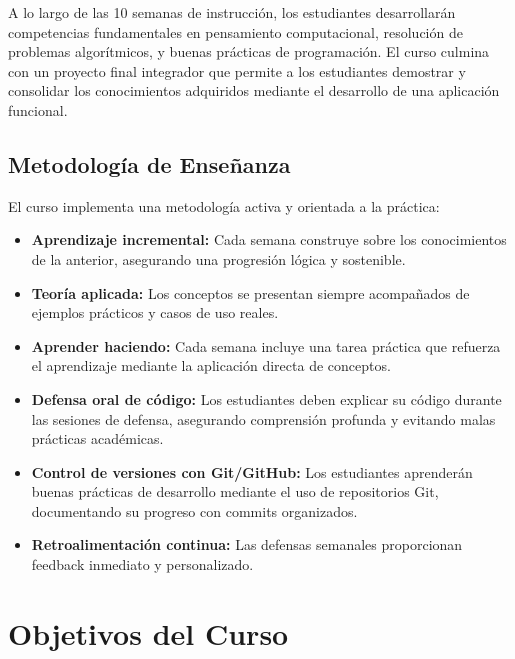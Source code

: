 \documentclass[12pt,letterpaper]{article}
\begin{document}
A lo largo de las 10 semanas de instrucción, los estudiantes desarrollarán competencias fundamentales en pensamiento computacional, resolución de problemas algorítmicos, y buenas prácticas de programación. El curso culmina con un proyecto final integrador que permite a los estudiantes demostrar y consolidar los conocimientos adquiridos mediante el desarrollo de una aplicación funcional.

\subsection{Metodología de Enseñanza}

El curso implementa una metodología activa y orientada a la práctica:

\begin{itemize}[leftmargin=*]
    \item \textbf{Aprendizaje incremental:} Cada semana construye sobre los conocimientos de la anterior, asegurando una progresión lógica y sostenible.
    
    \item \textbf{Teoría aplicada:} Los conceptos se presentan siempre acompañados de ejemplos prácticos y casos de uso reales.
    
    \item \textbf{Aprender haciendo:} Cada semana incluye una tarea práctica que refuerza el aprendizaje mediante la aplicación directa de conceptos.
    
    \item \textbf{Defensa oral de código:} Los estudiantes deben explicar su código durante las sesiones de defensa, asegurando comprensión profunda y evitando malas prácticas académicas.
    
    \item \textbf{Control de versiones con Git/GitHub:} Los estudiantes aprenderán buenas prácticas de desarrollo mediante el uso de repositorios Git, documentando su progreso con commits organizados.
    
    \item \textbf{Retroalimentación continua:} Las defensas semanales proporcionan feedback inmediato y personalizado.
\end{itemize}

\newpage

\section{Objetivos del Curso}
\end{document}
